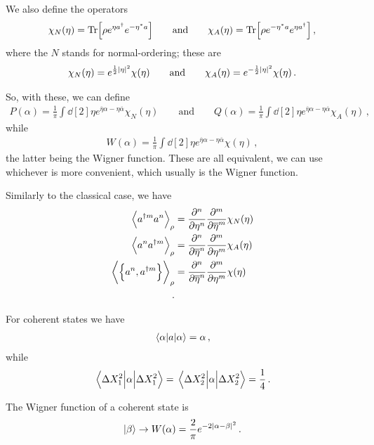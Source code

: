 \documentclass[main.tex]{subfiles}
\begin{document}
We also define the operators 
%
\begin{align}
\chi_{N} (\eta ) =
\Tr[\rho e^{\eta a ^\dag} e^{- \eta^{*} a}]
\qquad \text{and} \qquad
\chi_{A} (\eta ) =
\Tr[\rho  e^{- \eta^{*} a} e^{\eta a ^\dag}]
\,,
\end{align}
%
where the \(N\) stands for normal-ordering; these are 
%
\begin{align}
\chi_{N} (\eta ) = e^{ \frac{1}{2} \abs{\eta }^2} \chi (\eta )
\qquad \text{and} \qquad
\chi_{A} (\eta ) = e^{- \frac{1}{2} \abs{\eta }^2} \chi (\eta )
\,.
\end{align}

So, with these, we can define 
%
\begin{align}
P(\alpha ) = \frac{1}{\pi } \int \dd[2]{\eta } e^{ \overline{\eta} \alpha - \eta \overline{\alpha}} \chi_{N}(\eta ) \qquad \text{and} \qquad
Q(\alpha ) = \frac{1}{\pi } \int \dd[2]{\eta } e^{ \overline{\eta} \alpha - \eta \overline{\alpha}} \chi_{A}(\eta )
\,,
\end{align}
%
while 
%
\begin{align}
W(\alpha ) = \frac{1}{\pi } \int \dd[2]{\eta } e^{ \overline{\eta} \alpha - \eta \overline{\alpha}} \chi(\eta )
\,,
\end{align}
%
the latter being the Wigner function. 
These are all equivalent, we can use whichever is more convenient, which usually is the Wigner function. 

Similarly to the classical case, we have 
%
\begin{align}
\expval{a ^{\dag m} a^{n}}_{\rho } &= \pdv[n]{\eta } \pdv[m]{\overline{\eta}} \chi_{N} (\eta ) \\
\expval{a^{n} a ^{\dag m} }_{\rho } &= \pdv[n]{\overline{\eta} } \pdv[m]{\eta} \chi_{A} (\eta )\\
\expval{ \qty{ a^{n}, a ^{\dag m}} }_{\rho } &= \pdv[n]{\overline{\eta} } \pdv[m]{\eta} \chi (\eta ) \\
\,.
\end{align}

For coherent states we have 
%
\begin{align}
\ev{a}{\alpha } = \alpha 
\,,
\end{align}
%
while 
%
\begin{align}
\ev{\alpha }{\Delta X^2_{1}} =
\ev{\alpha }{\Delta X^2_{2}} 
= \frac{1}{4}
\,.
\end{align}

The Wigner function of a coherent state is 
%
\begin{align}
\ket{\beta } \rightarrow W(\alpha ) = \frac{2}{\pi } e^{-2 \abs{\alpha - \beta }^2}
\,.
\end{align}
\end{document}
